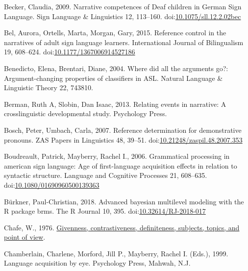 \documentclass[]{elsarticle} %
\newlength{\cslhangindent}
\newenvironment{CSLReferences}[2] %
 {%
  \setlength{\parindent}{0pt}
  \ifodd #1 \everypar{\setlength{\hangindent}{\cslhangindent}}\ignorespaces\fi
  \ifnum #2 > 0
  \setlength{\parskip}{#2\baselineskip}
  \fi
 }%
 {}
\begin{document}
\begin{CSLReferences}{1}{0}
\leavevmode{}%
Becker, Claudia, 2009. Narrative competences of Deaf children in German
Sign Language. Sign Language \& Linguistics 12, 113--160.
doi:\href{https://doi.org/10.1075/sll.12.2.02bec}{10.1075/sll.12.2.02bec}

\leavevmode{}%
Bel, Aurora, Ortells, Marta, Morgan, Gary, 2015. Reference control in
the narratives of adult sign language learners. International Journal of
Bilingualism 19, 608--624.
doi:\href{https://doi.org/10.1177/1367006914527186}{10.1177/1367006914527186}

\leavevmode{}%
Benedicto, Elena, Brentari, Diane, 2004. Where did all the arguments
go?: Argument-changing properties of classifiers in ASL. Natural
Language \& Linguistic Theory 22, 743810.

\leavevmode{}%
Berman, Ruth A, Slobin, Dan Isaac, 2013. Relating events in narrative: A
crosslinguistic developmental study. Psychology Press.

\leavevmode{}%
Bosch, Peter, Umbach, Carla, 2007. Reference determination for
demonstrative pronouns. ZAS Papers in Linguistics 48, 39--51.
doi:\href{https://doi.org/10.21248/zaspil.48.2007.353}{10.21248/zaspil.48.2007.353}

\leavevmode{}%
Boudreault, Patrick, Mayberry, Rachel I., 2006. Grammatical processing
in american sign language: Age of first-language acquisition effects in
relation to syntactic structure. Language and Cognitive Processes 21,
608--635.
doi:\href{https://doi.org/10.1080/01690960500139363}{10.1080/01690960500139363}

\leavevmode{}%
Bürkner, Paul-Christian, 2018. Advanced bayesian multilevel modeling
with the R package brms. The R Journal 10, 395.
doi:\href{https://doi.org/10.32614/RJ-2018-017}{10.32614/RJ-2018-017}

\leavevmode{}%
Chafe, W., 1976.
\href{https:///paper/Givenness\%2C-contrastiveness\%2C-definiteness\%2C-subjects\%2C-Chafe/805a12a9bee00562f6c2663722e9f7f3f5991848}{Givenness,
contrastiveness, definiteness, subjects, topics, and point of view}.

\leavevmode{}%
Chamberlain, Charlene, Morford, Jill P., Mayberry, Rachel I. (Eds.),
1999. Language acquisition by eye. Psychology Press, Mahwah, N.J.


\end{CSLReferences}
\end{document}
